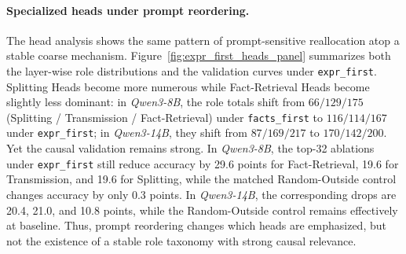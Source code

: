 \documentclass[11pt]{article}
\begin{document}
\paragraph{Specialized heads under prompt reordering.}
The head analysis shows the same pattern of prompt-sensitive reallocation atop a stable coarse mechanism. Figure~\ref{fig:expr_first_heads_panel} summarizes both the layer-wise role distributions and the validation curves under \texttt{expr\_first}. Splitting Heads become more numerous while Fact-Retrieval Heads become slightly less dominant: in \textit{Qwen3-8B}, the role totals shift from $66/129/175$ (Splitting / Transmission / Fact-Retrieval) under \texttt{facts\_first} to $116/114/167$ under \texttt{expr\_first}; in \textit{Qwen3-14B}, they shift from $87/169/217$ to $170/142/200$. Yet the causal validation remains strong. In \textit{Qwen3-8B}, the top-32 ablations under \texttt{expr\_first} still reduce accuracy by 29.6 points for Fact-Retrieval, 19.6 for Transmission, and 19.6 for Splitting, while the matched Random-Outside control changes accuracy by only 0.3 points. In \textit{Qwen3-14B}, the corresponding drops are 20.4, 21.0, and 10.8 points, while the Random-Outside control remains effectively at baseline. Thus, prompt reordering changes which heads are emphasized, but not the existence of a stable role taxonomy with strong causal relevance.
\end{document}
